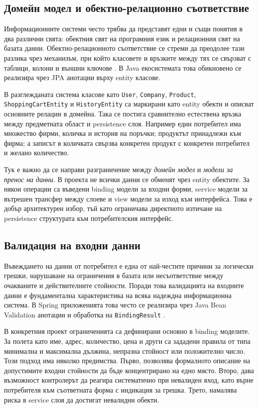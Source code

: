 \subsection{Домейн модел и обектно-релационно съответствие}

Информационните системи често трябва да представят едни и същи понятия в два различни свята: обектния свят на програмния език и релационния свят на базата данни. Обектно-релационното съответствие се стреми да преодолее тази разлика чрез механизъм, при който класовете и връзките между тях се свързват с таблици, колони и външни ключове \cite{springdatajpa}. В Java екосистемата това обикновено се реализира чрез JPA анотации върху entity класове.

В разглежданата система класове като \texttt{User}, \texttt{Company}, \texttt{Product}, \texttt{ShoppingCartEntity} и \texttt{HistoryEntity} са маркирани като entity обекти и описват основните релации в домейна. Така се постига сравнително естествена връзка между предметната област и persistence слоя. Например един потребител има множество фирми, количка и история на поръчки; продуктът принадлежи към фирма; а записът в количката свързва конкретен продукт с конкретен потребител и желано количество.

Тук е важно да се направи разграничение между \textit{домейн модел} и \textit{модели за пренос на данни}. В проекта не всички данни се обменят чрез entity обектите. За някои операции са въведени binding модели за входни форми, service модели за вътрешен трансфер между слоеве и view модели за изход към интерфейса. Това е добър архитектурен избор, тъй като ограничава директното изтичане на persistence структурата към потребителския интерфейс.

\subsection{Валидация на входни данни}

Въвеждането на данни от потребител е една от най-честите причини за логически грешки, нарушаване на ограничения в базата или несъответствие между очакваните и действителните стойности. Поради това валидацията на входните данни е фундаментална характеристика на всяка надеждна информационна система. В Spring приложенията това често се реализира чрез Java Bean Validation анотации и обработка на \texttt{BindingResult} \cite{hibernatevalidator}.

В конкретния проект ограниченията са дефинирани основно в binding моделите. За полета като име, адрес, количество, цена и други са зададени правила от типа минимална и максимална дължина, непразна стойност или положително число. Този подход има няколко предимства. Първо, позволява формалното описание на допустимите входни стойности да бъде концентрирано на едно място. Второ, дава възможност контролерът да реагира систематично при невалиден вход, като върне потребителя към съответната форма с индикация за грешка. Трето, намалява риска в service слоя да достигат невалидни обекти.

